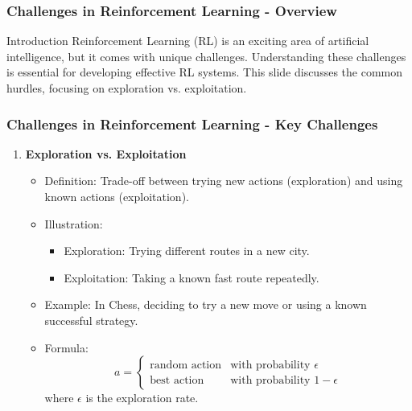 \documentclass[aspectratio=169]{beamer}
\begin{document}
\begin{frame}[fragile]
    \frametitle{Challenges in Reinforcement Learning - Overview}
    \begin{block}{Introduction}
        Reinforcement Learning (RL) is an exciting area of artificial intelligence, but it comes with unique challenges. Understanding these challenges is essential for developing effective RL systems. This slide discusses the common hurdles, focusing on exploration vs. exploitation.
    \end{block}
\end{frame}

\begin{frame}[fragile]
    \frametitle{Challenges in Reinforcement Learning - Key Challenges}
    \begin{enumerate}
        \item \textbf{Exploration vs. Exploitation}
        \begin{itemize}
            \item Definition: Trade-off between trying new actions (exploration) and using known actions (exploitation).
            \item Illustration: 
                \begin{itemize}
                    \item Exploration: Trying different routes in a new city.
                    \item Exploitation: Taking a known fast route repeatedly.
                \end{itemize}
            \item Example: In Chess, deciding to try a new move or using a known successful strategy.
            \item Formula:
            \begin{equation}
                a = 
                \begin{cases} 
                \text{random action} & \text{with probability } \epsilon \\
                \text{best action} & \text{with probability } 1 - \epsilon 
                \end{cases}
            \end{equation}
            where \( \epsilon \) is the exploration rate.
        \end{itemize}
    \end{enumerate}
\end{frame}
\end{document}
